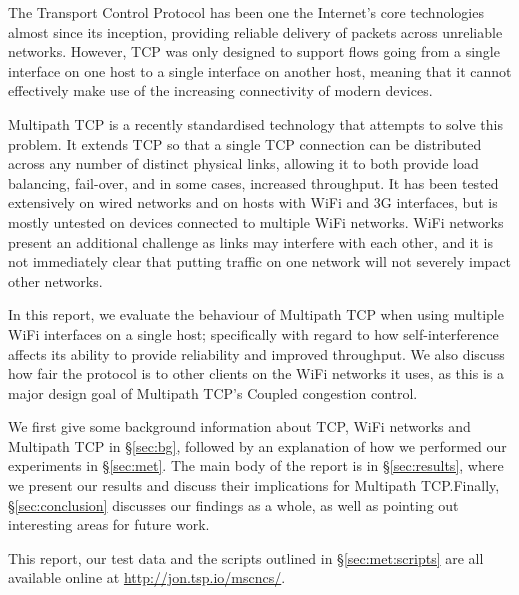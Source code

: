 The Transport Control Protocol has been one the Internet's core technologies
almost since its inception, providing reliable delivery of packets across
unreliable networks. However, TCP was only designed to support flows going from
a single interface on one host to a single interface on another host, meaning
that it cannot effectively make use of the increasing connectivity of modern
devices.

Multipath TCP is a recently standardised technology that attempts to solve this
problem. It extends TCP so that a single TCP connection can be distributed
across any number of distinct physical links, allowing it to both provide load
balancing, fail-over, and in some cases, increased throughput. It has been
tested extensively on wired networks and on hosts with WiFi and 3G interfaces,
but is mostly untested on devices connected to multiple WiFi networks. WiFi
networks present an additional challenge as links may interfere with each other,
and it is not immediately clear that putting traffic on one network will not
severely impact other networks.

In this report, we evaluate the behaviour of Multipath TCP when using multiple
WiFi interfaces on a single host; specifically with regard to how
self-interference affects its ability to provide reliability and improved
throughput. We also discuss how fair the protocol is to other clients on the
WiFi networks it uses, as this is a major design goal of Multipath TCP's Coupled
congestion control.

We first give some background information about TCP, WiFi networks and Multipath
TCP in \S\ref{sec:bg}, followed by an explanation of how we performed our
experiments in \S\ref{sec:met}. The main body of the report is in
\S\ref{sec:results}, where we present our results and discuss their implications
for Multipath TCP.\@ Finally, \S\ref{sec:conclusion} discusses our findings as a
whole, as well as pointing out interesting areas for future work.

This report, our test data and the scripts outlined in \S\ref{sec:met:scripts}
are all available online at \url{http://jon.tsp.io/mscncs/}.
